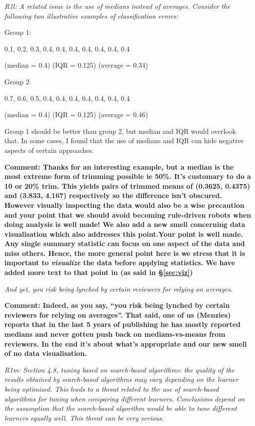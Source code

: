 \documentclass[preprint,10pt]{elsarticle}
\begin{document}
{\em R1l:  A related issue is the use of medians instead of averages. Consider the following two illustrative examples of classification errors:

Group 1: 

0.1, 0.2, 0.3, 0.4, 0.4, 0.4, 0.4, 0.4, 0.4, 0.4

(median = 0.4)
(IQR = 0.125)
(average = 0.34)

Group 2:

0.7, 0.6, 0.5, 0.4, 0.4, 0.4, 0.4, 0.4, 0.4, 0.4

(median = 0.4)
(IQR = 0.125)
(average = 0.46)

Group 1 should be better than group 2, but median and IQR would overlook that. In some cases, I found that the use of medians and IQR can hide negative aspects of certain approaches. }

{\bf Comment: Thanks for an interesting example, but a median is the most extreme form of trimming possible ie 50\%.  It's customary to do a 10 or 20\% trim.  This yields pairs of trimmed means of (0.3625, 0.4375) and (3.833, 4.167) respectively so the difference isn't obscured.  However visually inspecting the data would also be a wise precaution and your point that we should avoid becoming rule-driven robots when doing analysis is well made!  We also add a new smell concerning data visualisation which also addresses this point.Your point is well made. Any single summary statistic can focus on one aspect of the data and miss others. Hence, the more general point here is we stress that it is important to {\em visualize} the data before applying statistics. We have added more text to that point in (as said in \S\vref{sec:viz})}

{\em And yet, you risk being lynched by certain reviewers for relying on averages.}

{\bf Comment: Indeed, as you say, ``you risk being lynched by certain reviewers for relying on averages''.  That said, one of us (Menzies) reports that in the last 5 years of publishing he has mostly reported medians and never gotten push back on medians-vs-means from reviewers. In the end it's about what's appropriate and our new smell of no data visualisation.   
}

{\em R1m:  Section 4.8, tuning based on search-based algorithms: the quality of the results obtained by search-based algorithms may vary depending on the learner being optimized. This leads to a threat related to the use of search-based algorithms for tuning when comparing different learners. Conclusions depend on the assumption that the search-based algorithm would be able to tune different learners equally well. This threat can be very serious.}
\end{document}
